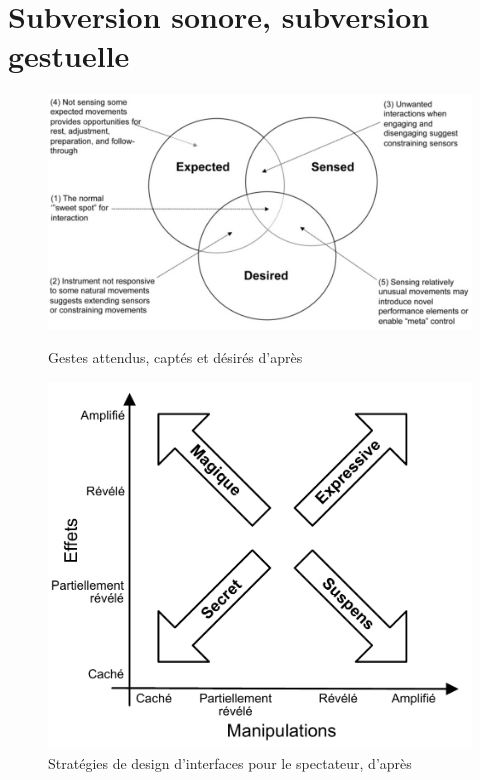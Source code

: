 \section{Subversion sonore, subversion gestuelle}
\label{sec:gesture:subversion}
\begin{figure}[!htbp]
	\captionsetup{format=plain}%
	\centering
	\begin{minipage}[t]{0.48\textwidth}
	  \includegraphics[width=\linewidth]{gfx/03_gesture/Benford_expected-sensed-desired.png}
		\caption[Gestes attendus, captés et désirés]{Gestes attendus, captés et désirés d'après \cite{benford_performing_2010}}
		\label{fig:Benford_expected-sensed-desired}
	\end{minipage}
	\hspace{.02\linewidth}
	\begin{minipage}[t]{0.48\textwidth}
		\includegraphics[width=\linewidth]{gfx/03_gesture/ManipulationVsEffect2.pdf}
		\caption[Stratégies de design d'interfaces pour le spectateur]{Stratégies de design d'interfaces pour le spectateur, d'après \cite{reeves_designing_2005, benford_performing_2010}}
		\label{fig:gesture:Benford}
	\end{minipage}
\end{figure}
